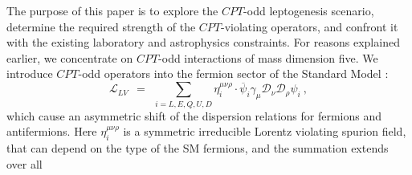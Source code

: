 \documentclass[12pt]{revtex4}
\newcommand{\md}{\mathcal{D}}
\newcommand{\ov}{\overline}
\begin{document}
    
    The purpose of this paper is to explore the $CPT$-odd leptogenesis scenario, 
    determine the required strength of the $CPT$-violating operators, and confront it with the 
    existing laboratory and astrophysics constraints. 
 For reasons explained earlier, we  concentrate on $CPT$-odd interactions of mass dimension five. 
%	
	We introduce $CPT$-odd operators into the fermion sector of the Standard Model
\cite{MP:}:
\begin{equation}
\label{LV}
	\mathcal{L}_{LV} ~~=~~ \sum_{i=L,E,Q,U,D}\eta_i^{\mu\nu\rho}\cdot \ov{\psi}_i\gamma_\mu \md_\nu \md_\rho \psi_i~,
\end{equation}
	which cause an asymmetric shift of the dispersion relations for fermions and antifermions.
	Here $\eta_i^{\mu\nu\rho}$ is a symmetric irreducible Lorentz violating spurion field, that 
	can depend on the type of the SM fermions, and the summation extends over all 
\end{document}
